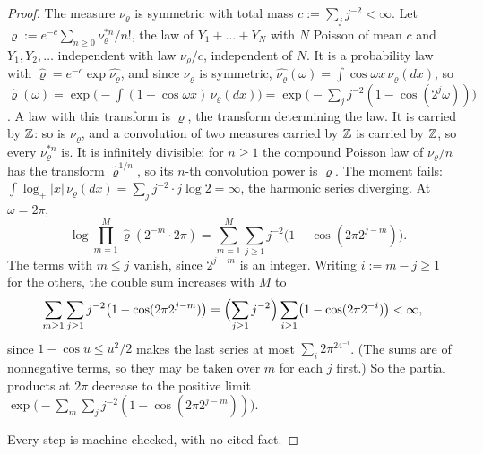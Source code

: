 \begin{proof}
\leanok
The measure $\nu_\varrho$ is symmetric with total mass $c := \sum_jj^{-2} < \infty$. Let
$\varrho := e^{-c}\sum_{n \ge 0}\nu_\varrho^{*n}/n!$, the law of $Y_1 + \dots + Y_N$ with $N$ Poisson
of mean $c$ and $Y_1, Y_2, \dots$ independent with law $\nu_\varrho/c$, independent of $N$. It is a
probability law with $\widehat\varrho = e^{-c}\exp\widehat{\nu_\varrho}$, and since $\nu_\varrho$ is
symmetric, $\widehat{\nu_\varrho}(\omega) = \int\cos\omega x\,\nu_\varrho(dx)$, so
$\widehat\varrho(\omega) = \exp\bigl(-\int(1 - \cos\omega x)\,\nu_\varrho(dx)\bigr)
= \exp\bigl(-\sum_jj^{-2}(1 - \cos(2^j\omega))\bigr)$. A law with this transform is $\varrho$, the
transform determining the law. It is carried by $\mathbb{Z}$: so is $\nu_\varrho$, and a convolution of two
measures carried by $\mathbb{Z}$ is carried by $\mathbb{Z}$, so every $\nu_\varrho^{*n}$ is. It is infinitely
divisible: for $n \ge 1$ the compound Poisson law of $\nu_\varrho/n$ has the transform
$\widehat\varrho^{1/n}$, so its $n$-th convolution power is $\varrho$. The moment fails:
$\int\log_+|x|\,\nu_\varrho(dx) = \sum_jj^{-2}\cdot j\log 2 = \infty$, the harmonic series diverging.
At $\omega = 2\pi$,
\[
  -\log\prod_{m=1}^M\widehat\varrho(2^{-m}\cdot2\pi) = \sum_{m=1}^M\sum_{j \ge 1}j^{-2}\bigl(1 - \cos(2\pi2^{j-m})\bigr).
\]
The terms with $m \le j$ vanish, since $2^{j-m}$ is an integer. Writing $i := m - j \ge 1$ for the
others, the double sum increases with $M$ to
\[
  \sum_{m \ge 1}\sum_{j \ge 1}j^{-2}\bigl(1 - \cos(2\pi2^{j-m})\bigr) = \Bigl(\sum_{j \ge 1}j^{-2}\Bigr)
  \sum_{i \ge 1}\bigl(1 - \cos(2\pi2^{-i})\bigr) < \infty,
\]
since $1 - \cos u \le u^2/2$ makes the last series at most $\sum_i2\pi^24^{-i}$. (The sums are of
nonnegative terms, so they may be taken over $m$ for each $j$ first.) So the partial products at
$2\pi$ decrease to the positive limit $\exp\bigl(-\sum_m\sum_jj^{-2}(1 - \cos(2\pi2^{j-m}))\bigr)$.

Every step is machine-checked, with no cited fact.
\end{proof}

